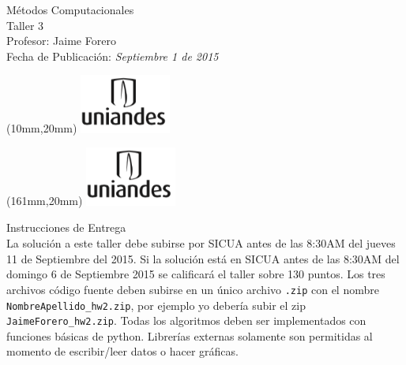 \documentclass[11pt,letterpaper]{exam}
\begin{document}
\begin{center}
{\Large Métodos Computacionales} \\
Taller 3 \\
Profesor: Jaime Forero\\
Fecha de Publicación: {\small \it Septiembre 1 de 2015}\\
\end{center}

\begin{textblock*}{40mm}(10mm,20mm)
  \includegraphics[width=3cm]{logoUniandes.png}
\end{textblock*}

\begin{textblock*}{40mm}(161mm,20mm)
  \includegraphics[width=3cm]{logoUniandes.png}
\end{textblock*}

\vspace{0.5cm}

{\Large Instrucciones de Entrega}\\

\noindent
La solución a este taller debe subirse por SICUA antes de las 8:30AM
del jueves 11 de Septiembre del 2015. 
\noindent
Si la soluci\'on est\'a en SICUA
antes de las 8:30AM del domingo 6 de Septiembre 2015 se calificar\'a
el taller sobre 130 puntos. 
\noindent
Los tres archivos c\'odigo fuente deben subirse en un \'unico archivo
\verb".zip" con el nombre \verb"NombreApellido_hw2.zip", por ejemplo
yo deber\'ia subir el zip \verb"JaimeForero_hw2.zip".
\noindent
Todas los algoritmos deben ser implementados con funciones b\'asicas
de python. Librer\'ias externas solamente son permitidas al momento de
escribir/leer datos o hacer gr\'aficas.
\end{document}
